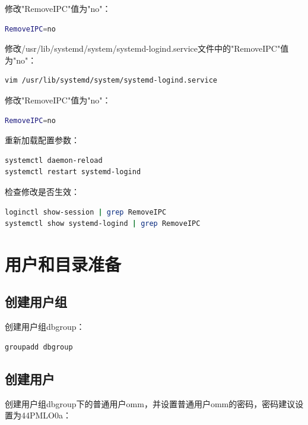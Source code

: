 \documentclass[12pt,UTF8]{ctexbook}
\begin{document}
修改"RemoveIPC"值为"no"：

\begin{lstlisting}[language=bash, caption=RemoveIPC配置]
RemoveIPC=no
\end{lstlisting}

修改/usr/lib/systemd/system/systemd-logind.service文件中的"RemoveIPC"值为"no"：

\begin{lstlisting}[language=bash, caption=修改systemd-logind.service]
vim /usr/lib/systemd/system/systemd-logind.service
\end{lstlisting}

修改"RemoveIPC"值为"no"：

\begin{lstlisting}[language=bash, caption=RemoveIPC配置]
RemoveIPC=no
\end{lstlisting}

重新加载配置参数：

\begin{lstlisting}[language=bash, caption=重新加载配置]
systemctl daemon-reload
systemctl restart systemd-logind
\end{lstlisting}

检查修改是否生效：

\begin{lstlisting}[language=bash, caption=检查配置]
loginctl show-session | grep RemoveIPC
systemctl show systemd-logind | grep RemoveIPC
\end{lstlisting}

\section{用户和目录准备}

\subsection{创建用户组}

创建用户组dbgroup：

\begin{lstlisting}[language=bash, caption=创建用户组]
groupadd dbgroup
\end{lstlisting}

\subsection{创建用户}

创建用户组dbgroup下的普通用户omm，并设置普通用户omm的密码，密码建议设置为44PMLO0a：
\end{document}

